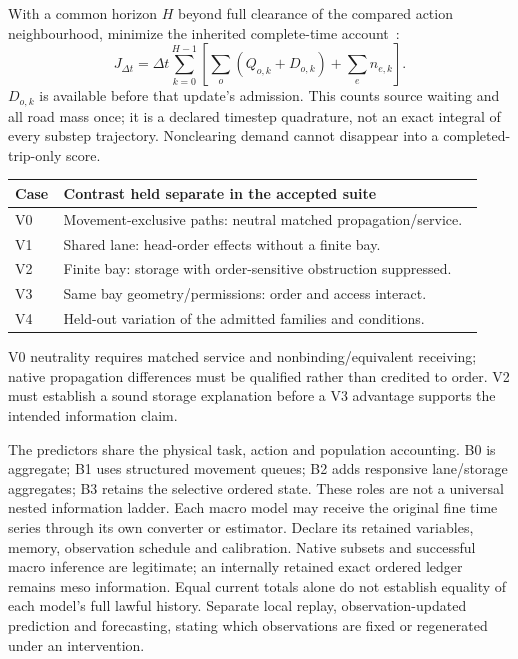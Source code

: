 \documentclass[10pt,a4paper]{article}
\begin{document}
With a common horizon $H$ beyond full clearance of the compared action
neighbourhood, minimize the inherited complete-time account~\cite{m0}:
\begin{equation}
 J_{\Delta t}
 =\Delta t\sum_{k=0}^{H-1}
 \left[\sum_o(Q_{o,k}+D_{o,k})+\sum_en_{e,k}\right].
 \label{eq:compact-tst}
\end{equation}
$D_{o,k}$ is available before that update's admission.
This counts source waiting and all road mass once; it is a declared
timestep quadrature, not an exact integral of every substep trajectory.
Nonclearing demand cannot disappear into a completed-trip-only score.

\begin{center}
\setlength{\tabcolsep}{5pt}
\begin{tabular}{@{}p{0.07\linewidth}p{0.86\linewidth}@{}}
\toprule
Case & Contrast held separate in the accepted suite\\
\midrule
V0 & Movement-exclusive paths: neutral matched propagation/service.\\
V1 & Shared lane: head-order effects without a finite bay.\\
V2 & Finite bay: storage with order-sensitive obstruction suppressed.\\
V3 & Same bay geometry/permissions: order and access interact.\\
V4 & Held-out variation of the admitted families and conditions.\\
\bottomrule
\end{tabular}
\end{center}
V0 neutrality requires matched service and nonbinding/equivalent
receiving; native propagation differences must be qualified rather than
credited to order. V2 must establish a sound storage explanation before
a V3 advantage supports the intended information claim.

The predictors share the physical task, action and population accounting.
B0 is aggregate; B1 uses structured movement queues; B2 adds responsive
lane/storage aggregates; B3 retains the selective ordered state.
These roles are not a universal nested information ladder.
Each macro model may receive the original fine time series through its
own converter or estimator. Declare its retained variables, memory,
observation schedule and calibration. Native subsets and successful
macro inference are legitimate; an internally retained exact ordered
ledger remains meso information. Equal current totals alone do not
establish equality of each model's full lawful history.
Separate local replay, observation-updated prediction and forecasting,
stating which observations are fixed or regenerated under an intervention.
\end{document}
